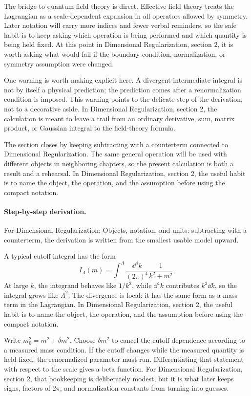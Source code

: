 The bridge to quantum field theory is direct.  Effective field theory treats the Lagrangian as a scale-dependent expansion in all operators allowed by symmetry.  Later notation will carry more indices and fewer verbal reminders, so the safe habit is to keep asking which operation is being performed and which quantity is being held fixed.  At this point in Dimensional Regularization, section 2, it is worth asking what would fail if the boundary condition, normalization, or symmetry assumption were changed.

One warning is worth making explicit here.  A divergent intermediate integral is not by itself a physical prediction; the prediction comes after a renormalization condition is imposed.  This warning points to the delicate step of the derivation, not to a decorative aside.  In Dimensional Regularization, section 2, the calculation is meant to leave a trail from an ordinary derivative, sum, matrix product, or Gaussian integral to the field-theory formula.

The section closes by keeping subtracting with a counterterm connected to Dimensional Regularization.  The same general operation will be used with different objects in neighboring chapters, so the present calculation is both a result and a rehearsal.  In Dimensional Regularization, section 2, the useful habit is to name the object, the operation, and the assumption before using the compact notation.



\paragraph{Step-by-step derivation.}

For Dimensional Regularization: Objects, notation, and units: subtracting with a counterterm, the derivation is written from the smallest usable model upward.

A typical cutoff integral has the form
\[
  I_\Lambda(m)=\int^{\Lambda}\frac{\dd^4k}{(2\pi)^4}\frac{1}{k^2+m^2}.
\]
At large \(k\), the integrand behaves like \(1/k^2\), while \(\dd^4k\) contributes \(k^3\dd k\), so the integral grows like \(\Lambda^2\).  The divergence is local: it has the same form as a mass term in the Lagrangian.  In Dimensional Regularization, section 2, the useful habit is to name the object, the operation, and the assumption before using the compact notation.

Write \(m_0^2=m^2+\delta m^2\).  Choose \(\delta m^2\) to cancel the cutoff dependence according to a measured mass condition.  If the cutoff changes while the measured quantity is held fixed, the renormalized parameter must run.  Differentiating that statement with respect to the scale gives a beta function.  For Dimensional Regularization, section 2, that bookkeeping is deliberately modest, but it is what later keeps signs, factors of \(2\pi\), and normalization constants from turning into guesses.

